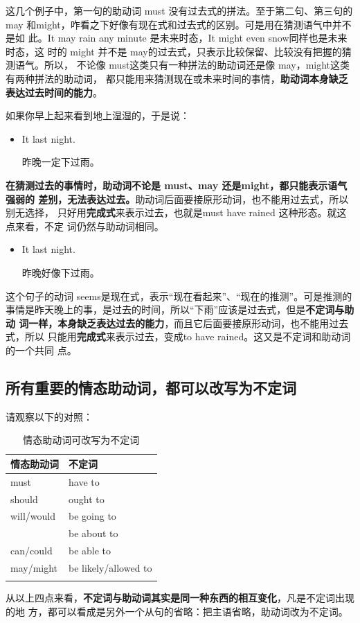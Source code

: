 这几个例子中，第一句的助动词 must 没有过去式的拼法。至于第二句、第三句的may
和might，咋看之下好像有现在式和过去式的区别。可是用在猜测语气中并不是如
此。It may rain any minute 是未来时态，It might even snow同样也是未来时态，这
时的 might 并不是 may的过去式，只表示比较保留、比较没有把握的猜测语气。所以，
不论像 must这类只有一种拼法的助动词还是像 may，might这类有两种拼法的助动词，
都只能用来猜测现在或未来时间的事情，\textbf{助动词本身缺乏表达过去时间的能力}。

如果你早上起来看到地上湿湿的，于是说：

\begin{itemize}
\item  It  last night.

  昨晚一定下过雨。
\end{itemize}

\textbf{在猜测过去的事情时，助动词不论是 must、may 还是might，都只能表示语气强弱的
  差别，无法表达过去。}助动词后面要接原形动词，也不能用过去式，所以别无选择，
只好用\textbf{完成式}来表示过去，也就是must have rained 这种形态。就这点来看，不定
词仍然与助动词相同。

\begin{itemize}
\item  It  last night.

  昨晚好像下过雨。
\end{itemize}

这个句子的动词 seems是现在式，表示“现在看起来”、“现在的推测”。可是推测的
事情是昨天晚上的事，是过去的时间，所以“下雨”应该是过去式，但是\textbf{不定词与助动
  词一样，本身缺乏表达过去的能力}，而且它后面要接原形动词，也不能用过去式，所以
只能用\textbf{完成式}来表示过去，变成to have rained。这又是不定词和助动词的一个共同
点。

\subsection{所有重要的情态助动词，都可以改写为不定词}

请观察以下的对照：
\begin{longtable}[]{@{}ll@{}}
  \toprule
  情态助动词 & 不定词\\\midrule
  must & have to \\
  should & ought to \\
  will/would & be going to \\
             & be about to \\
  can/could & be able to \\
  may/might & be likely/allowed  to \\
  \bottomrule
  \caption{\label{tab:modalinf}情态助动词可改写为不定词}
\end{longtable}
从以上四点来看，\textbf{不定词与助动词其实是同一种东西的相互变化}，凡是不定词出现的地
方，都可以看成是另外一个从句的省略：把主语省略，助动词改为不定词。

